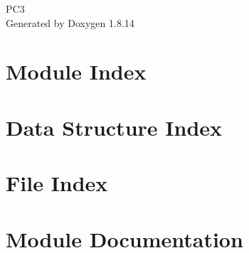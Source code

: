 \documentclass[twoside]{book}
\newcommand{\+}{\discretionary{\mbox{\scriptsize$\hookleftarrow$}}{}{}}
\newcommand{\clearemptydoublepage}{%
  \newpage{\pagestyle{empty}\cleardoublepage}%
}
\begin{document}
\begin{titlepage}
\vspace*{7cm}
\begin{center}%
{\Large P\+C3 }\\
\vspace*{1cm}
{\large Generated by Doxygen 1.8.14}\\
\end{center}
\end{titlepage}
\clearemptydoublepage
{}
\tableofcontents
\clearemptydoublepage
{}

\chapter{Module Index}

\chapter{Data Structure Index}

\chapter{File Index}

\chapter{Module Documentation}






























\end{document}
